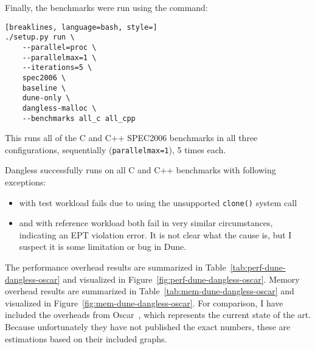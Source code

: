 Finally, the benchmarks were run using the command:

\begin{lstlisting}[breaklines, language=bash, style=]
./setup.py run \
	--parallel=proc \
	--parallelmax=1 \
	--iterations=5 \
	spec2006 \
	baseline \
	dune-only \
	dangless-malloc \
	--benchmarks all_c all_cpp
\end{lstlisting}

This runs all of the C and C++ SPEC2006 benchmarks in all three configurations, sequentially (\texttt{parallelmax=1}), 5 times each.

Dangless successfully runs on all C and C++ benchmarks with following exceptions:

\begin{itemize}
	\item {} with test workload fails due to using the unsupported \lstinline!clone()! system call
	\item {} and  with reference workload both fail in very similar circumstances, indicating an EPT violation error. It is not clear what the cause is, but I suspect it is some limitation or bug in Dune.
\end{itemize}


The performance overhead results are summarized in Table~\ref{tab:perf-dune-dangless-oscar} and visualized in Figure~\ref{fig:perf-dune-dangless-oscar}. Memory overhead results are summarized in Table~\ref{tab:mem-dune-dangless-oscar} and visualized in Figure~\ref{fig:mem-dune-dangless-oscar}. For comparison, I have included the overheads from Oscar~\cite{oscar2017}, which represents the current state of the art. Because unfortunately they have not published the exact numbers, these are estimations based on their included graphs.


